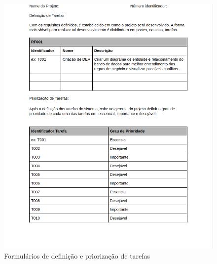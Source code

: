 \documentclass[	DIV=calc,%
							paper=a4,%
							fontsize=12pt,%
							onecolumn]{scrartcl}	 					%
\begin{document}
\begin{figure}
	\centering
	\includegraphics[width=\textwidth]{tarefas1}
	\caption{Formulários de definição e priorização de tarefas}
	\label{Figura 3}
\end{figure}
\end{document}
